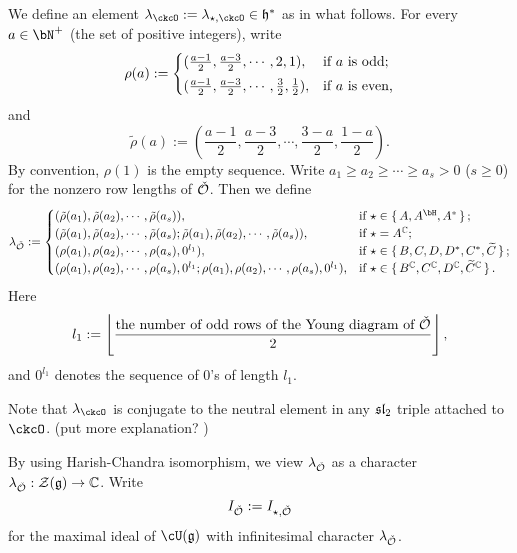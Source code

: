 \documentclass[counting_main.tex]{subfiles}
\begin{document}
We define an element $\lambda_{\ckcO}:=\lambda_{\star, \ckcO} \in \h^*$ as in
what follows. For every $a\in \bN^+$ (the set of positive integers), write
\[
  \rho(a):=\begin{cases}
    (\frac{a-1}{2}, \frac{a-3}{2}, \cdots, 2,1),  &\textrm{if $a$ is odd;}\smallskip\\
    (\frac{a-1}{2}, \frac{a-3}{2}, \cdots, \frac{3}{2}, \frac{1}{2}), &\textrm{if $a$ is even,}\\
  \end{cases}
\]
and
\[
  \tilde \rho(a):= (\frac{a-1}{2}, \frac{a-3}{2}, \cdots, \frac{3-a}{2},\frac{1-a}{2}).
\]
By convention, $\rho(1)$ is the empty sequence. Write
$a_1\geq a_2\geq \cdots\geq a_s>0$ ($s\geq 0$) for the nonzero row lengths of
$\check {{\mathcal {O}}}$. Then we define
\[
  \lambda_{\check \CO}:= \begin{cases}
    (\tilde \rho( a_1), \tilde \rho(a_2),  \cdots, \tilde \rho(a_s)), & \text{if } \star \in \set{A, A^\bH, A^*};\\
    (\tilde \rho( a_1), \tilde \rho(a_2),  \cdots, \tilde \rho(a_s); \tilde \rho( a_1), \tilde \rho(a_2),  \cdots, \tilde \rho(a_s)), & \text{if } \star =A^\C;\\
    (\rho( a_1), \rho(a_2),  \cdots, \rho(a_s), 0^{l_1} ) , & \text{if } \star \in \set{B, C, D, D^*, C^*,\widetilde C};\\
    (\rho( a_1), \rho(a_2),  \cdots, \rho(a_s), 0^{l_1} ;  \rho( a_1), \rho(a_2),  \cdots, \rho(a_s), 0^{l_1} ) , & \text{if } \star \in \set{B^\C, C^\C, D^\C, \widetilde C^\C}.\\
  \end{cases}
\]
Here
\[
  l_1:= \left\lfloor\frac{\textrm{the number of odd rows of the Young diagram of
        $\check {{\mathcal {O}}}$}}{2}\right\rfloor,
\]
and $0^{l_1}$ denotes the sequence of $0$'s of length $l_1$.

Note that $\lambda_{\ckcO}$ is conjugate to the neutral element in any
$\mathfrak{sl}_{2}$ triple attached to $\ckcO$. (put more explanation? )

By using Harish-Chandra isomorphism, we view $\lambda_{\check {{\mathcal {O}}}}$ as a
character $\lambda_{\check {{\mathcal {O}}}}: \mathcal Z(\mathfrak g)\rightarrow \mathbb{C}$. Write
\[
  I_{\check {{\mathcal {O}}}}:=I_{\star, \check {{\mathcal {O}}}}
\] for the maximal ideal of $\cU(\g)$ with infinitesimal character
$\lambda_{\check {{\mathcal {O}}}}$.
\end{document}
